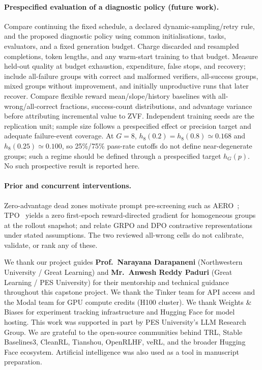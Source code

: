 \documentclass{article}
\begin{document}
\paragraph{Prespecified evaluation of a diagnostic policy (future work).}
Compare continuing the fixed schedule, a declared dynamic-sampling/retry rule,
and the proposed diagnostic policy using common initialisations, tasks,
evaluators, and a fixed generation budget. Charge discarded and resampled
completions, token lengths, and any warm-start training to that budget.
Measure held-out quality at budget exhaustion, expenditure, false stops, and
recovery; include all-failure groups with correct and malformed verifiers,
all-success groups, mixed groups without improvement, and initially
unproductive runs that later recover. Compare flexible reward mean/slope/history
baselines with all-wrong/all-correct fractions, success-count distributions,
and advantage variance before attributing incremental value to ZVF.
Independent training seeds are the replication unit; sample size follows a
prespecified effect or precision target and adequate failure-event coverage.
At $G=8$, $h_8(0.2)=h_8(0.8)\simeq0.168$ and $h_8(0.25)\simeq0.100$, so
25\%/75\% pass-rate cutoffs do not define near-degenerate groups; such a regime
should be defined through a prespecified target $h_G(p)$. No such prospective
result is reported here.

\paragraph{Prior and concurrent interventions.}
Zero-advantage dead zones motivate prompt pre-screening such as
AERO~\citep{zhang2026aero}; TPO~\citep{kaddour2026tpo} yields a zero
first-epoch reward-directed gradient for homogeneous groups at the rollout
snapshot; and \citet{wu2025grpodpo} relate GRPO and DPO contrastive
representations under stated assumptions. The two reviewed all-wrong cells do
not calibrate, validate, or rank any of these.





\begin{ack}
\label{sec:acknowledgments}
We thank our project guides \textbf{Prof.~Narayana Darapaneni}
(Northwestern University / Great Learning) and
\textbf{Mr.~Anwesh Reddy Paduri} (Great Learning / PES University)
for their mentorship and technical guidance throughout this capstone project.
We thank the Tinker team for API access and the Modal team for GPU compute credits
(H100 cluster). We thank Weights \& Biases for experiment tracking infrastructure
and Hugging Face for model hosting. This work was supported in part by PES
University's LLM Research Group. We are grateful to the open-source communities
behind TRL, Stable Baselines3, CleanRL, Tianshou, OpenRLHF, veRL, and the
broader Hugging Face ecosystem.
Artificial intelligence was also used as a tool in manuscript preparation.
\end{ack}
\end{document}
